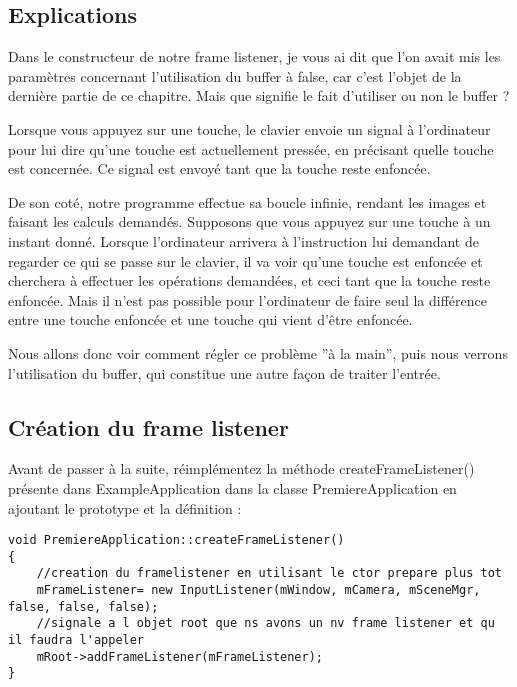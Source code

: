 \subsection{Explications}
Dans le constructeur de notre frame listener, je vous ai dit que l'on avait mis les param\`etres concernant l'utilisation du buffer \`a false, car c'est l'objet de la derni\`ere partie de ce chapitre. Mais que signifie le fait d'utiliser ou non le buffer ?

Lorsque vous appuyez sur une touche, le clavier envoie un signal \`a l'ordinateur pour lui dire qu'une touche est actuellement press\'ee, en pr\'ecisant quelle touche est concern\'ee. Ce signal est envoy\'e tant que la touche reste enfonc\'ee.

De son cot\'e, notre programme effectue sa boucle infinie, rendant les images et faisant les calculs demand\'es. Supposons que vous appuyez sur une touche \`a un instant donn\'e. Lorsque l'ordinateur arrivera \`a l'instruction lui demandant de regarder ce qui se passe sur le clavier, il va voir qu'une touche est enfonc\'ee et cherchera \`a effectuer les op\'erations demand\'ees, et ceci tant que la touche reste enfonc\'ee. Mais il n'est pas possible pour l'ordinateur de faire seul la diff\'erence entre une touche enfonc\'ee et une touche qui vient d'\^etre enfonc\'ee.

Nous allons donc voir comment r\'egler ce probl\`eme ''\`a la main'', puis nous verrons l'utilisation du buffer, qui constitue une autre fa\c{c}on de traiter l'entr\'ee.

\subsection{Cr\'eation du frame listener}

Avant de passer \`a la suite, r\'eimpl\'ementez la m\'ethode createFrameListener() pr\'esente dans ExampleApplication dans la classe PremiereApplication en ajoutant le prototype et la d\'efinition :

\begin{lstlisting}[caption={PremiereApplication::createFrameListener}]
void PremiereApplication::createFrameListener()
{
    //creation du framelistener en utilisant le ctor prepare plus tot
    mFrameListener= new InputListener(mWindow, mCamera, mSceneMgr, false, false, false);
    //signale a l objet root que ns avons un nv frame listener et qu il faudra l'appeler
    mRoot->addFrameListener(mFrameListener);
}
\end{lstlisting}

